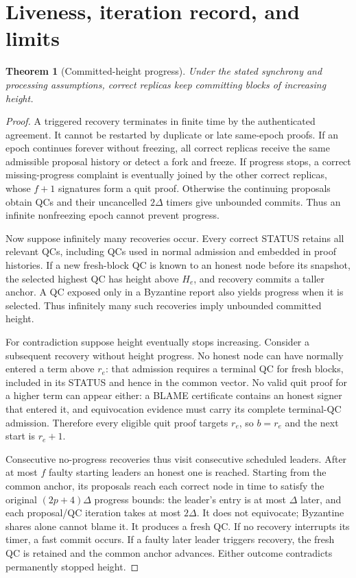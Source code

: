 \documentclass[10pt,a4paper]{article}
\newtheorem{theorem}{Theorem}
\begin{document}
\clearpage
\section*{Liveness, iteration record, and limits}
\begin{theorem}[Committed-height progress]
Under the stated synchrony and processing assumptions, correct replicas
keep committing blocks of increasing height.
\end{theorem}
\begin{proof}
A triggered recovery terminates in finite time by the authenticated
agreement. It cannot be restarted by duplicate or late same-epoch proofs.
If an epoch continues forever without freezing, all correct replicas
receive the same admissible proposal history or detect a fork and freeze.
If progress stops, a correct missing-progress complaint is eventually
joined by the other correct replicas, whose $f+1$ signatures form a quit
proof. Otherwise the continuing proposals obtain QCs and their uncancelled
$2\Delta$ timers give unbounded commits. Thus an infinite nonfreezing epoch
cannot prevent progress.

Now suppose infinitely many recoveries occur. Every correct STATUS retains
all relevant QCs, including QCs used in normal admission and embedded in
proof histories. If a new fresh-block QC is known to an honest node before
its snapshot, the selected highest QC has height above $H_e$, and recovery
commits a taller anchor. A QC exposed only in a Byzantine report also yields
progress when it is selected. Thus infinitely many such recoveries imply
unbounded committed height.

For contradiction suppose height eventually stops increasing. Consider a
subsequent recovery without height progress. No honest node can have
normally entered a term above $r_e$: that admission requires a terminal QC
for fresh blocks, included in its STATUS and hence in the common vector.
No valid quit proof for a higher term can appear either: a BLAME certificate
contains an honest signer that entered it, and equivocation evidence must
carry its complete terminal-QC admission. Therefore every eligible quit
proof targets $r_e$, so $b=r_e$ and the next start is $r_e+1$.

Consecutive no-progress recoveries thus visit consecutive scheduled leaders.
After at most $f$ faulty starting leaders an honest one is reached. Starting
from the common anchor, its proposals reach each correct node in time to
satisfy the original $(2p+4)\Delta$ progress bounds: the leader's entry is
at most $\Delta$ later, and each proposal/QC iteration takes at most
$2\Delta$. It does not equivocate; Byzantine shares alone cannot blame it.
It produces a fresh QC. If no recovery interrupts its timer, a fast commit
occurs. If a faulty later leader triggers recovery, the fresh QC is retained
and the common anchor advances. Either outcome contradicts permanently
stopped height.
\end{proof}
\end{document}
